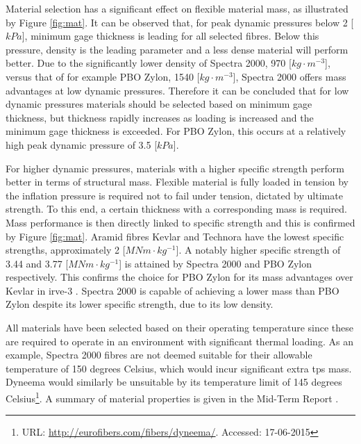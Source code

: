 Material selection has a significant effect on flexible material mass, as illustrated by Figure \ref{fig:mat}. It can be observed that, for peak dynamic pressures below 2 [$kPa$], minimum gage thickness is leading for all selected fibres. Below this pressure, density is the leading parameter and a less dense material will perform better. Due to the significantly lower density of Spectra 2000, 970 [$kg \cdot m^{-3}$], versus that of for example PBO Zylon, 1540 [$kg \cdot m^{-3}$], Spectra 2000 offers mass advantages at low dynamic pressures. Therefore it can be concluded that for low dynamic pressures materials should be selected based on minimum gage thickness, but thickness rapidly increases as loading is increased and the minimum gage thickness is exceeded. For PBO Zylon, this occurs at a relatively high peak dynamic pressure of 3.5 [$kPa$].

For higher dynamic pressures, materials with a higher specific strength perform better in terms of structural mass. Flexible material is fully loaded in tension by the inflation pressure is required not to fail under tension, dictated by ultimate strength. To this end, a certain thickness with a corresponding mass is required. Mass performance is then directly linked to specific strength and this is confirmed by Figure \ref{fig:mat}. Aramid fibres Kevlar and Technora have the lowest specific strengths, approximately 2 [$MNm \cdot kg^{-1}$]. A notably higher specific strength of 3.44 and 3.77 [$MNm \cdot kg^{-1}$] is attained by Spectra 2000 and PBO Zylon respectively. This confirms the choice for PBO Zylon for its mass advantages over Kevlar in \gls{irve}-3 \cite{Dillman2012a}. Spectra 2000 is capable of achieving a lower mass than PBO Zylon despite its lower specific strength, due to its low density. 

All materials have been selected based on their operating temperature since these are required to operate in an environment with significant thermal loading. As an example, Spectra 2000 fibres are not deemed suitable for their allowable temperature of 150 degrees Celsius, which would incur significant extra \acrfull{tps} mass. Dyneema would similarly be unsuitable by its temperature limit of 145 degrees Celsius\footnote{URL: \url{http://eurofibers.com/fibers/dyneema/}. Accessed: 17-06-2015}. A summary of material properties is given in the Mid-Term Report \cite[p.64]{Balasooriyan2015b}. 

